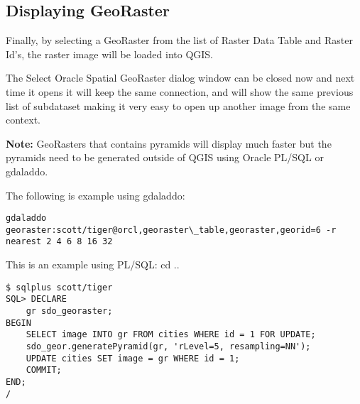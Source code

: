 \subsection{Displaying GeoRaster}

Finally, by selecting a GeoRaster from the list of Raster Data Table and Raster Id's, the raster image will be 
loaded into QGIS.

The Select Oracle Spatial GeoRaster dialog window can be closed now and next time it opens it will keep the same 
connection, and will show the same previous list of subdataset making it very easy to open up another image 
from the same context.

\textbf{Note:} GeoRasters that contains pyramids will display much faster but the pyramids need to be generated 
outside of QGIS using Oracle PL/SQL or gdaladdo.

The following is example using gdaladdo:

\begin{verbatim}
gdaladdo georaster:scott/tiger@orcl,georaster\_table,georaster,georid=6 -r 
nearest 2 4 6 8 16 32
\end{verbatim}

This is an example using PL/SQL: 
cd ..
\begin{verbatim}
$ sqlplus scott/tiger
SQL> DECLARE
    gr sdo_georaster;
BEGIN
    SELECT image INTO gr FROM cities WHERE id = 1 FOR UPDATE;
    sdo_geor.generatePyramid(gr, 'rLevel=5, resampling=NN');
    UPDATE cities SET image = gr WHERE id = 1;
    COMMIT;
END;
/
\end{verbatim}

\FloatBarrier
